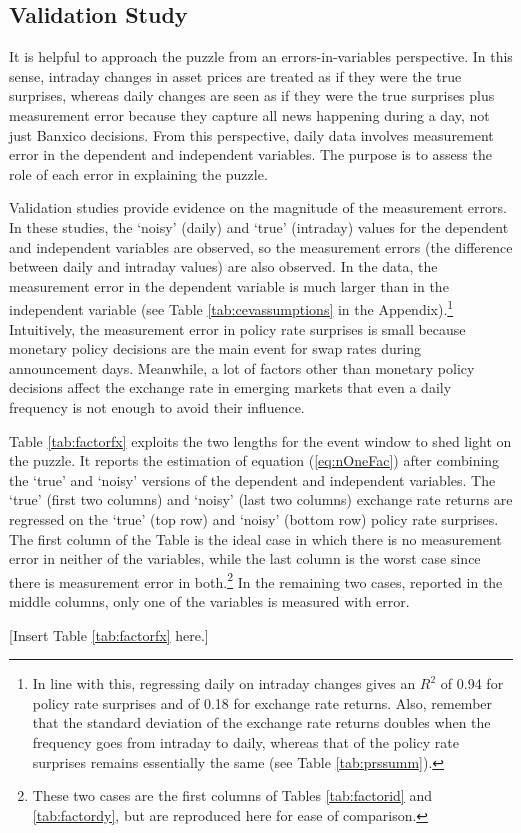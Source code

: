 \sectitlespace
\subsection{Validation Study} \label{sec:validation}
\sectitlespace
It is helpful to approach the puzzle from an errors-in-variables perspective. In this sense, intraday changes in asset prices are treated as if they were the true surprises, whereas daily changes are seen as if they were the true surprises plus measurement error because they capture all news happening during a day, not just Banxico decisions. From this perspective, daily data involves measurement error in the dependent and independent variables. The purpose is to assess the role of each error in explaining the puzzle.

Validation studies provide evidence on the magnitude of the measurement errors. In these studies, the `noisy' (daily) and `true' (intraday) values for the dependent and independent variables are observed, so the measurement errors (the difference between daily and intraday values) are also observed. In the data, the measurement error in the dependent variable is much larger than in the independent variable (see Table \ref{tab:cevassumptions} in the Appendix).\footnote{ In line with this, regressing daily on intraday changes gives an \(R^2\) of 0.94 for policy rate surprises and of 0.18 for exchange rate returns. Also, remember that the standard deviation of the exchange rate returns doubles when the frequency goes from intraday to daily, whereas that of the policy rate surprises remains essentially the same (see Table \ref{tab:prssumm}).} Intuitively, the measurement error in policy rate surprises is small because monetary policy decisions are the main event for swap rates during announcement days. Meanwhile, a lot of factors other than monetary policy decisions affect the exchange rate in emerging markets that even a daily frequency is not enough to avoid their influence.

Table \ref{tab:factorfx} exploits the two lengths for the event window to shed light on the puzzle. It reports the estimation of equation (\ref{eq:nOneFac}) after combining the `true’ and `noisy’ versions of the dependent and independent variables. The `true’ (first two columns) and `noisy’ (last two columns) exchange rate returns are regressed on the `true’ (top row) and `noisy’ (bottom row) policy rate surprises. The first column of the Table is the ideal case in which there is no measurement error in neither of the variables, while the last column is the worst case since there is measurement error in both.\footnote{These two cases are the first columns of Tables \ref{tab:factorid} and \ref{tab:factordy}, but are reproduced here for ease of comparison.} In the remaining two cases, reported in the middle columns, only one of the variables is measured with error.
%
\begin{center}
	[Insert Table \ref{tab:factorfx} here.]
\end{center}

